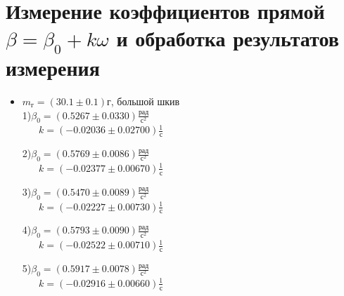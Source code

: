 \documentclass[a4paper,12pt]{article} %
\begin{document}
\section{Измерение коэффициентов прямой $\beta = \beta_0 + k\omega$ и обработка результатов измерения}
\begin{itemize}
\item $m_{\text{г}} = (30.1\pm0.1)\text{г}$, большой шкив\\
1)$\beta_0 = (0.5267\pm0.0330)\frac{\text{рад}}{\text{с}^2}$\\
$\text{ }\text{ }$ $k = (-0.02036\pm0.02700)\frac{1}{\text{с}}$

2)$\beta_0 = (0.5769\pm0.0086)\frac{\text{рад}}{\text{с}^2}$\\
$\text{ }\text{ }$ $k = (-0.02377\pm0.00670)\frac{1}{\text{с}}$

3)$\beta_0 = (0.5470\pm0.0089)\frac{\text{рад}}{\text{с}^2}$\\
$\text{ }\text{ }$ $k = (-0.02227\pm0.00730)\frac{1}{\text{с}}$

4)$\beta_0 = (0.5793\pm0.0090)\frac{\text{рад}}{\text{с}^2}$\\
$\text{ }\text{ }$ $k = (-0.02522\pm0.00710)\frac{1}{\text{с}}$

5)$\beta_0 = (0.5917\pm0.0078)\frac{\text{рад}}{\text{с}^2}$\\
$\text{ }\text{ }$ $k = (-0.02916\pm0.00660)\frac{1}{\text{с}}$


\end{itemize}
\end{document}
